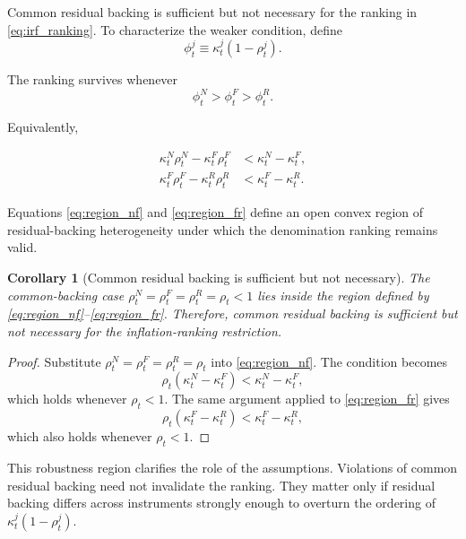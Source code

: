 \documentclass[12pt,a4paper]{article}
\newtheorem{corollary}{Corollary}
\begin{document}
Common residual backing is sufficient but not necessary for the ranking in
\eqref{eq:irf_ranking}. To characterize the weaker condition, define
\begin{equation}
\phi_t^j
\equiv
\kappa_t^j(1-\rho_t^j).
\end{equation}

The ranking survives whenever
\begin{equation}
\phi_t^N>\phi_t^F>\phi_t^R.
\label{eq:phi_ranking}
\end{equation}

Equivalently,

\begin{align}
\kappa_t^N\rho_t^N-\kappa_t^F\rho_t^F
&<
\kappa_t^N-\kappa_t^F,
\label{eq:region_nf}
\\
\kappa_t^F\rho_t^F-\kappa_t^R\rho_t^R
&<
\kappa_t^F-\kappa_t^R.
\label{eq:region_fr}
\end{align}


Equations \eqref{eq:region_nf} and \eqref{eq:region_fr} define an open convex region
of residual-backing heterogeneity under which the denomination ranking remains valid.

\begin{corollary}[Common residual backing is sufficient but not necessary]
The common-backing case $\rho_t^N=\rho_t^F=\rho_t^R=\rho_t<1$ lies inside the region
defined by \eqref{eq:region_nf}--\eqref{eq:region_fr}. Therefore, common residual
backing is sufficient but not necessary for the inflation-ranking restriction.
\end{corollary}

\begin{proof}
Substitute $\rho_t^N=\rho_t^F=\rho_t^R=\rho_t$ into
\eqref{eq:region_nf}. The condition becomes
\begin{equation}
\rho_t(\kappa_t^N-\kappa_t^F)
<
\kappa_t^N-\kappa_t^F,
\end{equation}
which holds whenever $\rho_t<1$. The same argument applied to
\eqref{eq:region_fr} gives
\begin{equation}
\rho_t(\kappa_t^F-\kappa_t^R)
<
\kappa_t^F-\kappa_t^R,
\end{equation}
which also holds whenever $\rho_t<1$.
\end{proof}

This robustness region clarifies the role of the assumptions. Violations of common
residual backing need not invalidate the ranking. They matter only if residual backing
differs across instruments strongly enough to overturn the ordering of
$\kappa_t^j(1-\rho_t^j)$.
\end{document}
